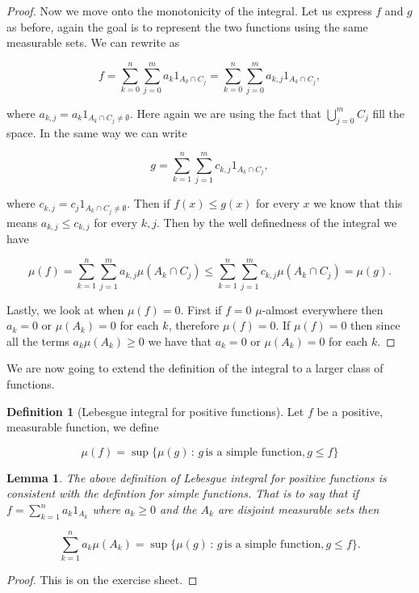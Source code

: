 \documentclass[
]{book}
\newtheorem{lemma}{Lemma}[chapter]
\theoremstyle{definition}
\newtheorem{definition}{Definition}[chapter]
\theoremstyle{definition}
\theoremstyle{definition}
\theoremstyle{definition}
\theoremstyle{remark}
\begin{document}
\begin{proof}
Now we move onto the monotonicity of the integral. Let us express \(f\) and \(g\) as before, again the goal is to represent the two functions using the same measurable sets. We can rewrite as

\[ f = \sum_{k=0}^n \sum_{j=0}^m a_k 1_{A_k \cap C_j} = \sum_{k=0}^n \sum_{j=0}^m a_{k,j}1_{A_k \cap C_j},\]

where \(a_{k,j} = a_k 1_{A_k \cap C_j \neq \emptyset}\). Here again we are using the fact that \(\bigcup_{j=0}^m C_j\) fill the space. In the same way we can write

\[ g = \sum_{k=1}^n \sum_{j=1}^m c_{k,j}1_{A_k \cap C_j}, \]

where \(c_{k,j} = c_j 1_{A_k \cap C_j \neq \emptyset}\). Then if \(f(x) \leq g(x)\) for every \(x\) we know that this means \(a_{k,j} \leq c_{k,j}\) for every \(k,j\). Then by the well definedness of the integral we have

\[ \mu(f) = \sum_{k=1}^n \sum_{j=1}^m a_{k,j} \mu(A_k \cap C_j) \leq \sum_{k=1}^n \sum_{j=1}^m c_{k,j} \mu(A_k \cap C_j) = \mu(g).\]

Lastly, we look at when \(\mu(f)=0\). First if \(f=0\) \(\mu\)-almost everywhere then \(a_k=0\) or \(\mu(A_k)=0\) for each \(k\), therefore \(\mu(f)=0\). If \(\mu(f) =0\) then since all the terms \(a_k \mu(A_k) \geq 0\) we have that \(a_k=0\) or \(\mu(A_k) =0\) for each \(k\).
\end{proof}

We are now going to extend the definition of the integral to a larger class of functions.

\begin{definition}[Lebesgue integral for positive functions]
Let \(f\) be a positive, measurable function, we define

\[ \mu(f) = \sup \{ \mu(g)\, :\, g \, \mbox{is a simple function}, g \leq f\} \]
\end{definition}

\begin{lemma}
The above definition of Lebesgue integral for positive functions is consistent with the defintion for simple functions. That is to say that if \(f = \sum_{k=1}^n a_k 1_{A_k}\) where \(a_k \geq 0\) and the \(A_k\) are disjoint measurable sets then

\[ \sum_{k=1}^n a_k \mu(A_k) = \sup \{ \mu(g)\, :\, g \, \mbox{is a simple function}, g \leq f\}.  \]
\end{lemma}

\begin{proof}
This is on the exercise sheet.
\end{proof}
\end{document}

